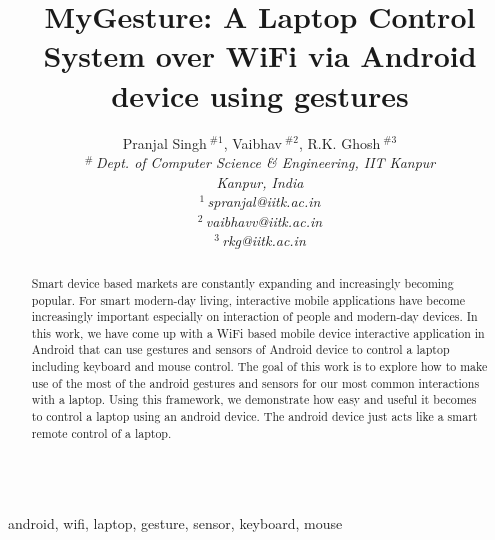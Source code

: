 \documentclass[10pt,conference,letterpaper]{IEEEtran}
\title{MyGesture: A Laptop Control System over WiFi via Android device using gestures}
\author{%
{Pranjal Singh{\small $~^{\#1}$}, Vaibhav{\small $~^{\#2}$}, R.K. Ghosh{\small $~^{\#3}$} }%
\vspace{1.6mm}\\
\fontsize{10}{10}\selectfont\itshape
$^{\#}$\,Dept. of Computer Science \& Engineering, IIT Kanpur\\
Kanpur, India\\
\fontsize{9}{9}\selectfont\ttfamily\upshape
%
$^{1}$\,spranjal@iitk.ac.in\\
$^{2}$\,vaibhavv@iitk.ac.in\\
$^{3}$\,rkg@iitk.ac.in%
\vspace{1.2mm}\\
\fontsize{10}{10}\selectfont\rmfamily\itshape
\fontsize{9}{9}\selectfont\ttfamily\upshape

}
\begin{document}
\maketitle
\thispagestyle{plain}
\pagestyle{plain}

\begin{abstract} 
Smart device based markets are constantly expanding and increasingly becoming popular. For smart modern-day living, interactive mobile applications have become increasingly important especially on interaction of people and modern-day devices. In this work, we have come up with a WiFi based mobile device interactive application in Android that can use gestures and sensors of Android device to control a laptop including keyboard and mouse control. The goal of this work is to explore how to make use of the most of the android gestures and sensors for our most common interactions with a laptop. Using this framework, we demonstrate how easy and useful it becomes to control a laptop using an android device. The android device just acts like a smart remote control of a laptop.\\\\
\end{abstract}
\begin{keywords}
android, wifi, laptop, gesture, sensor, keyboard, mouse\\
\end{keywords}
\end{document}
